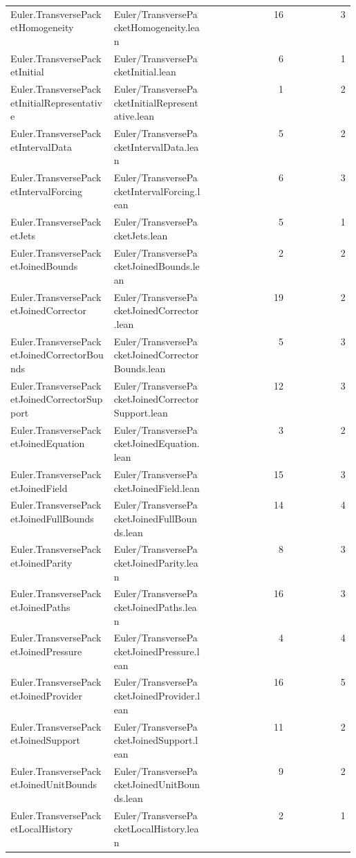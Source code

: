 \begin{longtable}{p{0.30\linewidth}p{0.28\linewidth}rr}
Euler.TransversePacketHomogeneity & Euler/TransversePacketHomogeneity.lean & 16 & 3\\
Euler.TransversePacketInitial & Euler/TransversePacketInitial.lean & 6 & 1\\
Euler.TransversePacketInitialRepresentative & Euler/TransversePacketInitialRepresentative.lean & 1 & 2\\
Euler.TransversePacketIntervalData & Euler/TransversePacketIntervalData.lean & 5 & 2\\
Euler.TransversePacketIntervalForcing & Euler/TransversePacketIntervalForcing.lean & 6 & 3\\
Euler.TransversePacketJets & Euler/TransversePacketJets.lean & 5 & 1\\
Euler.TransversePacketJoinedBounds & Euler/TransversePacketJoinedBounds.lean & 2 & 2\\
Euler.TransversePacketJoinedCorrector & Euler/TransversePacketJoinedCorrector.lean & 19 & 2\\
Euler.TransversePacketJoinedCorrectorBounds & Euler/TransversePacketJoinedCorrectorBounds.lean & 5 & 3\\
Euler.TransversePacketJoinedCorrectorSupport & Euler/TransversePacketJoinedCorrectorSupport.lean & 12 & 3\\
Euler.TransversePacketJoinedEquation & Euler/TransversePacketJoinedEquation.lean & 3 & 2\\
Euler.TransversePacketJoinedField & Euler/TransversePacketJoinedField.lean & 15 & 3\\
Euler.TransversePacketJoinedFullBounds & Euler/TransversePacketJoinedFullBounds.lean & 14 & 4\\
Euler.TransversePacketJoinedParity & Euler/TransversePacketJoinedParity.lean & 8 & 3\\
Euler.TransversePacketJoinedPaths & Euler/TransversePacketJoinedPaths.lean & 16 & 3\\
Euler.TransversePacketJoinedPressure & Euler/TransversePacketJoinedPressure.lean & 4 & 4\\
Euler.TransversePacketJoinedProvider & Euler/TransversePacketJoinedProvider.lean & 16 & 5\\
Euler.TransversePacketJoinedSupport & Euler/TransversePacketJoinedSupport.lean & 11 & 2\\
Euler.TransversePacketJoinedUnitBounds & Euler/TransversePacketJoinedUnitBounds.lean & 9 & 2\\
Euler.TransversePacketLocalHistory & Euler/TransversePacketLocalHistory.lean & 2 & 1\\

\end{longtable}

